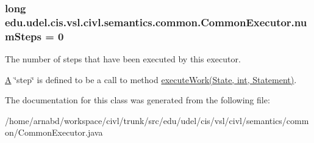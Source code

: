 \subsubsection[{num\+Steps}]{\setlength{\rightskip}{0pt plus 5cm}long edu.\+udel.\+cis.\+vsl.\+civl.\+semantics.\+common.\+Common\+Executor.\+num\+Steps = 0\hspace{0.3cm}{\ttfamily [protected]}}\label{classedu_1_1udel_1_1cis_1_1vsl_1_1civl_1_1semantics_1_1common_1_1CommonExecutor_aa0612bd3c7b03dbd293fe5fce2acf721}


The number of steps that have been executed by this executor. 

\hyperlink{structA}{A} \char`\"{}step\char`\"{} is defined to be a call to method \hyperlink{}{execute\+Work(\+State, int, Statement)}. 

The documentation for this class was generated from the following file\+:\begin{DoxyCompactItemize}
\item 
/home/arnabd/workspace/civl/trunk/src/edu/udel/cis/vsl/civl/semantics/common/Common\+Executor.\+java\end{DoxyCompactItemize}
